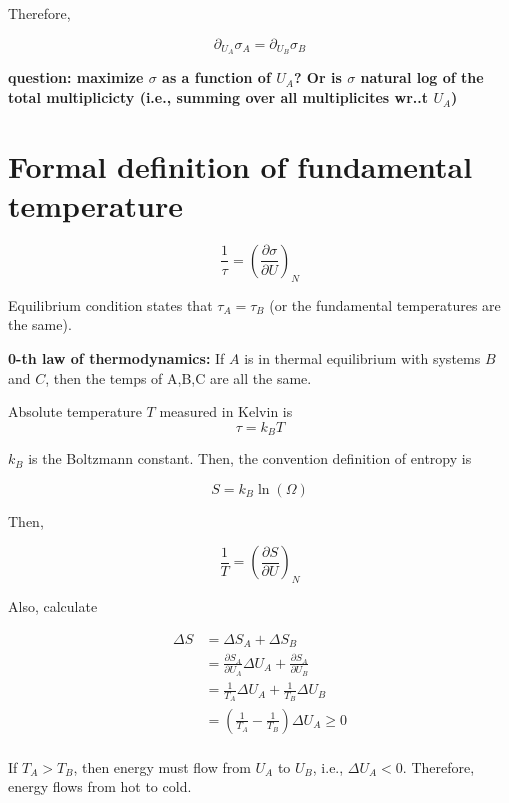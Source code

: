 \documentclass{article}
\newtheorem{one minute paper}[theorem]{One Minute Paper}
\begin{document}
Therefore, 

\begin{equation}
    \partial_{U_A}\sigma_A = \partial_{U_B}\sigma_B
\end{equation}

\textbf{question: maximize $\sigma$ as a function of $U_A$? Or is $\sigma$ natural log of the total multiplicicty (i.e., summing over all multiplicites wr..t $U_A$)}

\section*{Formal definition of fundamental temperature}

\begin{equation}
    \frac{1}{\tau} = \left( \frac{\partial \sigma}{\partial U} \right)_N
\end{equation}

Equilibrium condition states that $\tau_A = \tau_B$ (or the fundamental temperatures are the same). 

\textbf{0-th law of thermodynamics:} If $A$ is in thermal equilibrium with systems $B$ and $C$, then the temps of A,B,C are all the same. 

Absolute temperature $T$ measured in Kelvin is $$\tau = k_B T$$

$k_B$ is the Boltzmann constant. Then, the convention definition of entropy is 

\begin{equation}
    S = k_B \ln(\Omega)
\end{equation}

Then, 

\begin{equation}
    \frac{1}{T} = \left( \frac{\partial S}{\partial U} \right)_N
\end{equation}

Also, calculate 

\begin{align}
    \Delta S &= \Delta S_A + \Delta S_B  \\
    &= \frac{\partial S_A}{\partial U_A}\Delta U_A + \frac{\partial S_A}{\partial U_B} \\
    &= \frac{1}{T_A}\Delta U_A + \frac{1}{T_B} \Delta U_B \\
    &= \left( \frac{1}{T_A}- \frac{1}{T_B} \right) \Delta U_A \geq 0 \\      
\end{align}

If $T_A > T_B$, then energy must flow from $U_A$ to $U_B$, i.e., $\Delta U_A < 0$. Therefore, energy flows from hot to cold.
\end{document}
